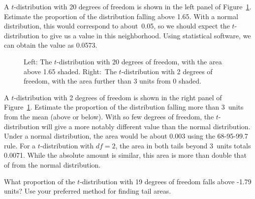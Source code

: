 \begin{examplewrap}
\begin{nexample}{A $t$-distribution with 20 degrees of freedom
    is shown in the left panel of
    Figure~\ref{tDistDF20RightTail1Point65}.
    Estimate the proportion of the distribution falling
    above 1.65.}
  With a normal distribution, this would correspond to
  about~0.05, so we should expect the $t$-distribution
  to give us a value in this neighborhood.
  Using statistical software, we can obtain the value
  as 0.0573.
\end{nexample}
\end{examplewrap}

\begin{figure}
  \centering
  \caption{Left: The $t$-distribution with 20 degrees
      of freedom, with the area above 1.65 shaded.
      Right:~The $t$-distribution with 2 degrees of freedom,
      with the area further than 3 units from 0 shaded.}
  \label{tDistDF20RightTail1Point65}
\end{figure}

\begin{examplewrap}
\begin{nexample}{A $t$-distribution with 2 degrees of freedom
    is shown in the right panel of
    Figure~\ref{tDistDF20RightTail1Point65}.
    Estimate the proportion of the distribution falling more
    than 3~units from the mean (above or below).}
  With so few degrees of freedom, the $t$-distribution will
  give a more notably different value than the normal
  distribution.
  Under a normal distribution, the area would be about
  0.003 using the 68-95-99.7 rule.
  For a $t$-distribution with $df = 2$, the area in both
  tails beyond 3~units totals 0.0071.
  While the absolute amount is similar, this area is more
  than double that of from the normal distribution.
\end{nexample}
\end{examplewrap}

\begin{exercisewrap}
\begin{nexercise}
What proportion of the $t$-distribution with 19 degrees
of freedom falls above -1.79 units?
Use your preferred method for finding tail areas.\footnotemark{}
\end{nexercise}
\end{exercisewrap}

